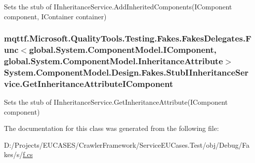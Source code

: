 Sets the stub of I\-Inheritance\-Service.\-Add\-Inherited\-Components(\-I\-Component component, I\-Container container)

\hypertarget{class_system_1_1_component_model_1_1_design_1_1_fakes_1_1_stub_i_inheritance_service_ab4d15c0a4d4ad4e7e9a3e68ca841fe91}{
\subsubsection[{Get\-Inheritance\-Attribute\-I\-Component}]{\setlength{\rightskip}{0pt plus 5cm}mqttf.\-Microsoft.\-Quality\-Tools.\-Testing.\-Fakes.\-Fakes\-Delegates.\-Func$<$global.\-System.\-Component\-Model.\-I\-Component, global.\-System.\-Component\-Model.\-Inheritance\-Attribute$>$ System.\-Component\-Model.\-Design.\-Fakes.\-Stub\-I\-Inheritance\-Service.\-Get\-Inheritance\-Attribute\-I\-Component}}\label{class_system_1_1_component_model_1_1_design_1_1_fakes_1_1_stub_i_inheritance_service_ab4d15c0a4d4ad4e7e9a3e68ca841fe91}


Sets the stub of I\-Inheritance\-Service.\-Get\-Inheritance\-Attribute(\-I\-Component component)



The documentation for this class was generated from the following file\-:\begin{DoxyCompactItemize}
\item 
D\-:/\-Projects/\-E\-U\-C\-A\-S\-E\-S/\-Crawler\-Framework/\-Service\-E\-U\-Cases.\-Test/obj/\-Debug/\-Fakes/s/\hyperlink{s_2f_8cs}{f.\-cs}\end{DoxyCompactItemize}
